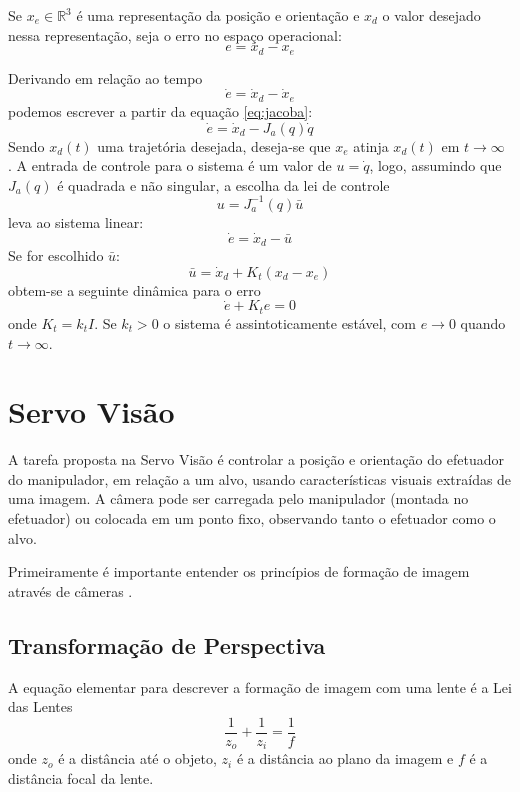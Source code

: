 Se ${x_e} \in \mathbb{R}^3$ é uma representação da posição e orientação e ${x}_d$ o valor desejado nessa representação, seja o erro no espaço operacional:
\begin{equation}
{e} = {x}_d - {x}_e
\end{equation}

Derivando em relação ao tempo
\begin{equation}
{\dot{e}} = {\dot{x}}_d - {\dot{x}_e}
\end{equation}
podemos escrever a partir da equação \ref{eq:jacoba}:
\begin{equation}
{\dot{e}} = {\dot{x}}_d - {J}_a({q})\dot{{q}}
\end{equation}
Sendo ${x}_d(t)$ uma trajetória desejada, deseja-se que ${x}_e$ atinja ${x}_d(t)$ em $t \to \infty$ .
A entrada de controle para o sistema é um valor de ${u} = \dot{{q}}$, logo, assumindo que ${J}_a({q})$ é quadrada e não singular, a escolha da lei de controle
\begin{equation}
{u} = {J}_a^{-1}({q})\bar{{u}}
\end{equation}
leva ao sistema linear:
\begin{equation}
\dot{{e}} = \dot{{x}}_d - \bar{{u}}
\end{equation}
Se for escolhido $\bar{{u}}$:
\begin{equation}
\bar{{u}} = \dot{{x}}_d + {K_t} ({x}_d - {x}_e)
\end{equation}
obtem-se a seguinte dinâmica para o erro
\begin{equation}
\dot{{e}} + {K_t} {e} = 0
\end{equation}
onde $K_t = k_t I$. Se $k_t > 0$ o sistema é assintoticamente estável, com $e \rightarrow 0$ quando $t \to \infty$.

\section{Servo Visão}
A tarefa proposta na Servo Visão é controlar a posição e orientação do efetuador do manipulador, em relação a um alvo, usando características visuais extraídas de uma imagem. A câmera pode ser carregada pelo manipulador (montada no efetuador) ou colocada em um ponto fixo, observando tanto o efetuador como o alvo.

Primeiramente é importante entender os princípios de formação de imagem através de câmeras \citep{petercorke}. 

\subsection{Transformação de Perspectiva}
A equação elementar para descrever a formação de imagem com uma lente é a Lei das Lentes
\begin{equation} 
\frac{1}{z_o} + \frac{1}{z_i} = \frac{1}{f}
\end{equation} 
onde $z_o$ é a distância até o objeto, $z_i$ é a distância ao plano da imagem e $f$ é a distância focal da lente.

